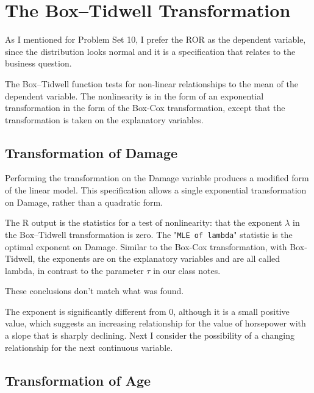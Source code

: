 \documentclass[11pt]{paper}
\begin{document}



\pagebreak
\section{The Box--Tidwell Transformation}\label{sec:Box-Tidwell}


{\color{red}
As I mentioned for Problem Set 10, 
I prefer the ROR as the dependent variable, since the distribution looks normal
and it is a specification that relates to the business question. 
}

The Box--Tidwell function tests for non-linear relationships
to the mean of the dependent variable.
The nonlinearity is in the form of an
exponential transformation in the form of the Box-Cox
transformation, except that the transformation is taken
on the explanatory variables.


\subsection{Transformation of Damage}


Performing the transformation on the Damage variable
produces a modified form of the linear model.
This specification allows a single exponential
transformation on Damage, rather than a quadratic form.



The \textsf{R} output is the statistics for a test of nonlinearity:
that the exponent $\lambda$ in the Box--Tidwell transformation is zero.
%
The "\texttt{MLE of lambda}" statistic is the optimal exponent on Damage.
Similar to the Box-Cox transformation,
with Box-Tidwell, the exponents are on the explanatory variables
and are all called lambda, in contrast
to the parameter $\tau$ in our class notes.

{\color{red}
These conclusions don't match what was found.
}


The exponent is significantly different from 0,
although it is a small positive value,
which suggests an increasing relationship
for the value of horsepower
with a slope that is sharply declining.
Next I consider the possibility of a changing relationship 
for the next continuous variable. 


\subsection{Transformation of Age}



\end{document}
